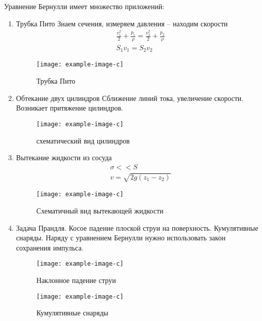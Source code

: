 Уравнение Бернулли имеет множество приложений:
\begin{enumerate}
	\item {Трубка Пито
	Знаем сечения, измеряем давления – находим скорости
	\begin{align*}
	& \frac { v _ { 1 } ^ { 2 } } { 2 } + \frac { p _ { 1 } } { \rho } = \frac { v _ { 2 } ^ { 2 } } { 2 } + \frac { p _ { 2 } } { \rho } \\
	& S _ { 1 } v _ { 1 } = S _ { 2 } v _ { 2 }
	\end{align*}
	\begin{figure}[H]
		\centering
		\texttt{[image: example-image-c]}
		\caption{Трубка Пито}
		\label{fig:figure8}
	\end{figure}
	}
	\item {Обтекание двух цилиндров
	Сближение линий тока, увеличение скорости. Возникает притяжение цилиндров.
	\begin{figure}[H]
		\centering
		\texttt{[image: example-image-c]}
		\caption{схематический вид цилиндров}
		\label{fig:figure9}
	\end{figure}
	}
	\item {Вытекание жидкости из сосуда
	\begin{align*}
	& \sigma < < S \\
	& v = \sqrt { 2 g \left( z _ { 1 } - z _ { 2 } \right) }
	\end{align*}
	\begin{figure}[H]
		\centering
		\texttt{[image: example-image-c]}
		\caption{Схематичный вид вытекающей жидкости}
		\label{fig:figure10}
	\end{figure}
	}
	\item {Задача Прандля. Косое падение плоской струи на поверхность. Кумулятивные снаряды. Наряду с уравнением Бернулли нужно использовать закон сохранения импульса.
	\begin{figure}[H]
		\centering
		\texttt{[image: example-image-c]}
		\caption{Наклонное падение струи}
		\label{fig:figure11}
	\end{figure}
	\begin{figure}[H]
		\centering
		\texttt{[image: example-image-c]}
		\caption{Кумулятивные снаряды}
		\label{fig:figure12}
	\end{figure}
	}
\end{enumerate}